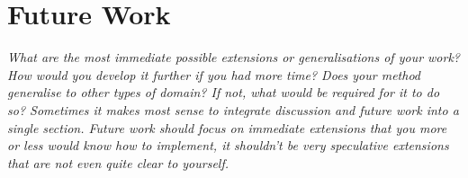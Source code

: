\section{Future Work}
\label{sec:future work}

\emph{What are the most immediate possible extensions or generalisations of your work? How would you develop it further if you had more time? Does your method generalise to other types of domain? If not, what would be required for it to do so? Sometimes it makes most sense to integrate discussion and future work into a single section. Future work should focus on immediate extensions that you more or less would know how to implement, it shouldn’t be very speculative extensions that are not even quite clear to yourself.}
